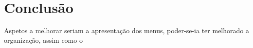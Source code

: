 \chapter{Conclusão}

Aspetos a melhorar seriam a apresentação dos menus, poder-se-ia ter melhorado a organização, assim como o 



